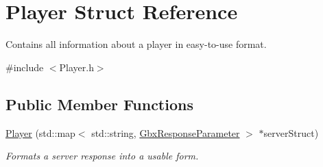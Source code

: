 \hypertarget{structPlayer}{\section{Player Struct Reference}
\label{structPlayer}
}


Contains all information about a player in easy-\/to-\/use format.  




{\ttfamily \#include $<$Player.\-h$>$}

\subsection*{Public Member Functions}
\begin{DoxyCompactItemize}
\item 
\hyperlink{structPlayer_a2fe883e7ea5578247a61fb31d0c87fb9}{Player} (std\-::map$<$ std\-::string, \hyperlink{classGbxResponseParameter}{Gbx\-Response\-Parameter} $>$ $\ast$server\-Struct)
\begin{DoxyCompactList}\small\item\em Formats a server response into a usable form. \end{DoxyCompactList}\end{DoxyCompactItemize}
